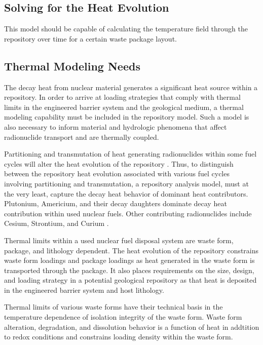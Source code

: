 \documentclass[letterpaper]{article}
\begin{document}
\subsection{Solving for the Heat Evolution}

This model should be capable of calculating the temperature field through the 
repository over time for a certain waste package layout. 



\subsection{Thermal Modeling Needs}
The decay heat from nuclear material generates a significant heat source within 
a 
repository. In order to arrive at loading strategies that comply with thermal 
limits in the engineered barrier system and the geological medium, a thermal 
modeling capability must be included in the repository model. Such a model is 
also necessary to inform material and hydrologic phenomena that affect 
radionuclide transport and are thermally coupled. 

Partitioning and transmutation of heat generating radionuclides within  
some fuel cycles will alter the heat evolution of the repository 
\cite{swift_applying_2010}. Thus, to distinguish  between the repository heat 
evolution associated with various fuel cycles involving partitioning and 
transmutation, a repository analysis model, must at the very least, 
capture the decay heat behavior of dominant heat contributors.  Plutonium, 
Americium, and their decay daughters dominate decay heat contribution within 
used nuclear fuels. Other contributing radionuclides include Cesium, Strontium, 
and Curium \cite{piet_which_2007}. 

Thermal limits within a used nuclear fuel disposal system are waste form, 
package, and lithology dependent. The heat evolution of the repository 
constrains waste form loadings and package loadings as heat 
generated in the waste form is transported through the package. It 
also places requirements on the size, design, and loading strategy in a 
potential geological repository as that heat is deposited in the engineered 
barrier system and host lithology.

Thermal limits of various waste forms have their technical basis in the 
temperature dependence of isolation integrity of the waste form. Waste form 
alteration, degradation, and dissolution behavior is a function of heat in 
addtition to redox conditions and constrains loading
density within the waste form. 
 
\end{document}
